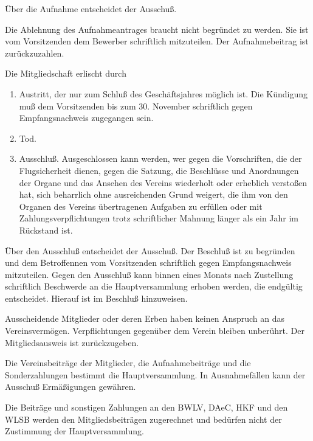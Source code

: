 \documentclass[10pt,a4paper,parskip=half]{scrartcl}
\begin{document}
\begin{contract}
    Über die Aufnahme entscheidet der Ausschuß.
    
    Die Ablehnung des Aufnahmeantrages braucht nicht begründet zu werden.
    Sie ist vom Vorsitzenden dem Bewerber schriftlich mitzuteilen.
    Der Aufnahmebeitrag ist zurückzuzahlen.
    
    \label{C:ErloeschenDerMitgliedschaft}
    Die Mitgliedschaft erlischt durch
    \begin{enumerate}[label=\alph*)]
      \item Austritt,
            der nur zum Schluß des Geschäftsjahres möglich ist.
            Die Kündigung muß dem Vorsitzenden bis zum 30. November schriftlich gegen Empfangsnachweis zugegangen sein.
      \item Tod.
            
      \item{Ausschluß.} Ausgeschlossen kann werden,
            wer gegen die Vorschriften,
            die der Flugsicherheit dienen,
            gegen die Satzung,
            die Beschlüsse und Anordnungen der Organe und das Ansehen des Vereins wiederholt oder erheblich verstoßen hat,
            sich beharrlich ohne ausreichenden Grund weigert,
            die ihm von den Organen des Vereins übertragenen Aufgaben zu erfüllen oder mit Zahlungsverpflichtungen trotz schriftlicher Mahnung länger als ein Jahr im Rückstand ist.
            \label{S:Ausschluss}
    \end{enumerate}
    
    Über den Ausschluß entscheidet der Ausschuß.
    Der Beschluß ist zu begründen und dem Betroffennen vom Vorsitzenden schriftlich gegen Empfangsnachweis mitzuteilen.
    Gegen den Ausschluß kann binnen eines Monats nach Zustellung schriftlich Beschwerde an die
    Hauptversammlung erhoben werden,
    die endgültig entscheidet.
    Hierauf ist im Beschluß hinzuweisen.
    
    Ausscheidende Mitglieder oder deren Erben haben keinen Anspruch an das Vereinsvermögen.
    Verpflichtungen gegenüber dem Verein bleiben unberührt.
    Der Mitgliedsausweis ist zurückzugeben.
    
    Die Vereinsbeiträge der Mitglieder,
    die Aufnahmebeiträge und die Sonderzahlungen bestimmt die Hauptversammlung.
    In Ausnahmefällen kann der Ausschuß Ermäßigungen gewähren.
    
    Die Beiträge und sonstigen Zahlungen an den BWLV,
    DAeC,
    HKF und den WLSB werden den Mitgliedsbeiträgen zugerechnet und bedürfen nicht der Zustimmung der Hauptversammlung.
    

\end{contract}
\end{document}
